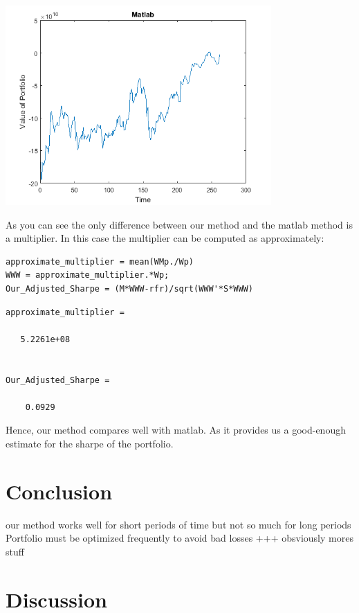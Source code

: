 \documentclass[12pt]{article}
\begin{document}
\includegraphics [width=4in]{testing_02.png}
\begin{par}
As you can see the only difference between our method and the matlab method is a multiplier. In this case the multiplier can be computed as approximately:
\end{par} \vspace{1em}
\begin{verbatim}
approximate_multiplier = mean(WMp./Wp)
WWW = approximate_multiplier.*Wp;
Our_Adjusted_Sharpe = (M*WWW-rfr)/sqrt(WWW'*S*WWW)
\end{verbatim}

        \color{lightgray} \begin{verbatim}
approximate_multiplier =

   5.2261e+08


Our_Adjusted_Sharpe =

    0.0929

\end{verbatim} \color{black}
    \begin{par}
Hence, our method compares well with matlab. As it provides us a good-enough estimate for the sharpe of the portfolio.
\end{par} \vspace{1em}
\section{Conclusion}
our method works well for short periods of time but not so much for long periods
Portfolio must be optimized frequently to avoid bad losses +++ obsviously mores stuff\\

\section{Discussion}
\end{document}
